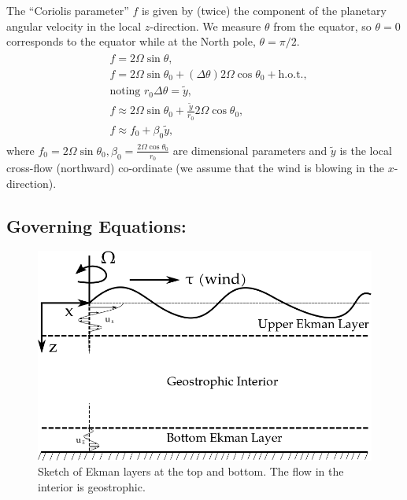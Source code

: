 \documentclass{article}
\begin{document}
The ``Coriolis parameter'' $f$ is given by (twice) the component of the planetary angular velocity in the local $z$-direction. We measure $\theta$ from the equator, so $\theta=0$ corresponds to the equator while at the North pole, $\theta=\pi/2$. 
\begin{align}\label{eq:beta-plane-approx}
 \begin{split}
  & f = 2\Omega \sin{\theta},\\
  & f = 2\Omega \sin{\theta_{0}} + (\Delta \theta) 2\Omega \cos{\theta_{0}} + \textrm{h.o.t.},\\
  &\textrm{noting } r_{0} \Delta \theta = \tilde{y},\\
  & f \approx 2\Omega \sin{\theta_{0}} + \frac{\tilde{y}}{r_{0}} 2\Omega \cos{\theta_{0}},\\
  & \boxed{ f \approx f_{0} + \beta_{0} \tilde{y}},
 \end{split}
\end{align}
where $f_{0} = 2\Omega \sin{\theta_{0}}, \beta_{0} = \frac{2\Omega \cos{\theta_{0}}}{r_{0}}$ are dimensional parameters and $\tilde{y}$ is the local cross-flow (northward) co-ordinate (we assume that the wind is blowing in the $x$-direction).  
\subsection{Governing Equations:}
\begin{figure}[H]
    \centering
    \includegraphics[scale = 0.5]{Figs/ekman_layers.png}
    \caption{Sketch of Ekman layers at the top and bottom. The flow in the interior is geostrophic.}
    \label{fig:ekman_layers}
\end{figure}
\end{document}
